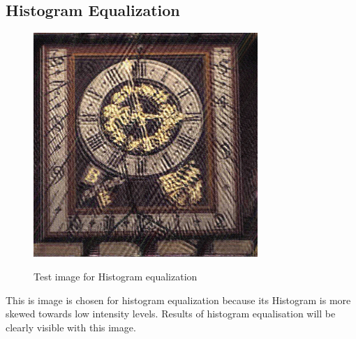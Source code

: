 \documentclass{article}
\begin{document}
\subsection{Histogram Equalization}
\begin{figure}[htb]

\begin{minipage}[b]{1.0\linewidth}
  \centering
  \centerline{\includegraphics[width=8.5cm]{temp.jpg}}
  \centerline{Test image for Histogram equalization\cite{WEBSITE:13}}\medskip
\end{minipage}
%
\end{figure}
This is image is chosen for histogram equalization because its Histogram is more skewed towards low intensity levels. Results of histogram equalisation will be clearly visible with this image. 
\end{document}
